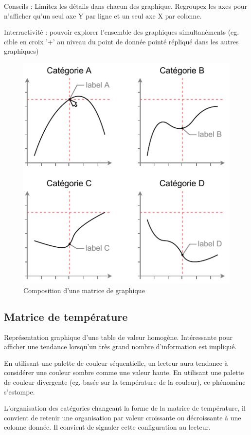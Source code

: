 \documentclass[a4paper,12pt]{article}
\begin{document}
\begin{multicols}{2}
Conseils : Limitez les détails dans chacun des graphique. \autocite{sosulskiGraphics2019} Regroupez les axes pour n'afficher qu'un seul axe Y par ligne et un seul axe X par colonne.

Interractivité : pouvoir explorer l'ensemble des graphiques simultanéments (eg. cible en croix '+' au niveau du point de donnée pointé répliqué dans les autres graphiques)

\begin{figure}[H]
\centering
\includegraphics[width=.9\linewidth]{./img/small-multiple.pdf}
\caption{\label{fig:org8c4664c}Composition d'une matrice de graphique}
\end{figure}
\subsection*{Matrice de température}
\label{sec:org2ff3328}
Représentation graphique d'une table de valeur homogène. \autocite{sosulskiGraphics2019}
Intéressante pour afficher une tendance lorsqu'un très grand nombre d'information est impliqué.

En utilisant une palette de couleur séquentielle, un lecteur aura tendance à considérer une couleur sombre comme une valeur haute. En utilisant une palette de couleur divergente (eg. basée sur la température de la couleur), ce phénomène s'estompe.

L'organisation des catégories changeant la forme de la matrice de température, il convient de retenir une organisation par valeur croissante ou décroissante à une colonne donnée. Il convient de signaler cette configuration au lecteur. \autocite{wilkeVisualizingAmounts2019}

\end{multicols}
\end{document}
